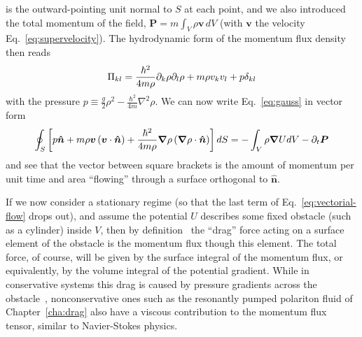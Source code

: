 \begin{subappendices}
is the outward-pointing unit normal to $S$ at each point, and we also
introduced the total momentum of the field,
$\bm{P} = m \int_{V} \rho \bm{v}\, dV$ (with $\bm{v}$ the velocity
Eq.~\eqref{eq:supervelocity}). The hydrodynamic form of the momentum
flux density then reads
%
\begin{equation}\label{eq:pressure}
  \Pi_{k l} = \frac{\hbar^2}{4m\rho} \partial_k\rho \partial_l\rho + m\rho v_k v_l + p\delta_{k l}
\end{equation}
% 
with the pressure
$p \equiv \frac{g}{2}\rho^2 - \frac{\hbar^2}{4m} \nabla^2 \rho$. We
can now write Eq.~\eqref{eq:gauss} in vector form
%
\begin{equation}\label{eq:vectorial-flow}
  \oint_S \left[ p \bm{\hat{n}} + m\rho \bm{v} \left(\bm{v} \cdot \bm{\hat{n}}\right) + \frac{\hbar^2}{4m\rho}\bm{\nabla}\rho \left(\bm{\nabla}\rho \cdot \bm{\hat{n}}\right)  \right] d S  = -\int_{V}  \rho \bm{\nabla} U dV - \partial_t \bm{P}
\end{equation}
% 
and see that the vector between square brackets is the amount of
momentum per unit time and area ``flowing'' through a surface
orthogonal to $\bm{\hat{n}}$.

If we now consider a stationary regime (so that the last term of
Eq.~\eqref{eq:vectorial-flow} drops out), and assume the potential $U$
describes some fixed obstacle (such as a cylinder) inside $V$, then by
definition~\cite{Landau:111625} the ``drag'' force acting on a surface
element of the obstacle is the momentum flux though this element. The
total force, of course, will be given by the surface integral of the
momentum flux, or equivalently, by the volume integral of the
potential gradient. While in conservative systems this drag is caused
by pressure gradients across the obstacle~\cite{PhysRevLett.82.5186},
nonconservative ones such as the resonantly pumped polariton fluid of
Chapter~\ref{cha:drag} also have a viscous contribution to the
momentum flux tensor, similar to Navier-Stokes physics.

\end{subappendices}

